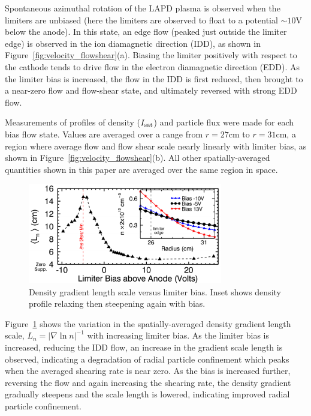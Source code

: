 \documentclass[aps,prl,amsmath,amssymb,preprint,superscriptaddress]{revtex4}
\begin{document}
Spontaneous azimuthal rotation of the LAPD plasma is observed when the limiters are
unbiased (here the limiters are observed to float to a
potential $\sim 10$V below the anode).  In this state, an edge flow
(peaked just outside the limiter edge) is
observed in the ion diamagnetic direction (IDD), as shown in
Figure~\ref{fig:velocity_flowshear}(a).  Biasing the limiter positively
with respect to the cathode tends to drive flow in the electron
diamagnetic direction (EDD).  As the limiter bias is increased, the
flow in the IDD is first reduced, then brought to a near-zero flow
and flow-shear state, and ultimately reversed with strong EDD flow.

Measurements of profiles of density ($I_{\rm sat}$) and particle flux
were made for each bias flow state. Values are averaged over a range
from $r=27$cm to $r=31$cm, a region where average flow and flow shear scale
nearly linearly with limiter bias, as shown in
Figure~\ref{fig:velocity_flowshear}(b).  All other spatially-averaged
quantities shown in this paper are averaged over the same region in space.

\begin{figure}[!htbp]
\centerline{
\includegraphics[width=8.5cm]{densgrad}}
\caption{\label{fig:densgrad} Density gradient length scale versus limiter bias. Inset shows density profile relaxing then steepening again with bias.}
\end{figure}

Figure~\ref{fig:densgrad} shows the variation in the spatially-averaged density gradient length scale, $L_{n} = \lvert \nabla \ln n \rvert ^{-1}$ with
increasing limiter bias.  As the limiter bias is increased, reducing
the IDD flow, an increase in the gradient scale length is observed,
indicating a degradation of radial particle confinement which peaks
when the averaged shearing rate is near zero. As the bias is
increased further, reversing the flow and again increasing the
shearing rate, the density gradient gradually steepens and the
scale length is lowered, indicating improved radial particle confinement.  
\end{document}
